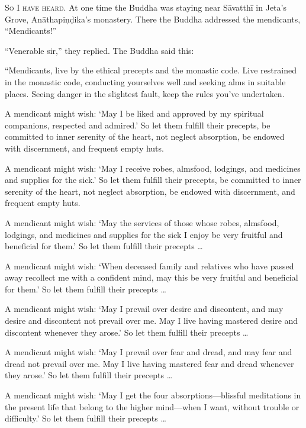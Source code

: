 \documentclass[12pt,openany]{book}%
\newcommand*{\scevam}[1]{\textsc{#1}}
\begin{document}
\scevam{So I have heard. }At one time the Buddha was staying near \textsanskrit{Sāvatthī} in Jeta’s Grove, \textsanskrit{Anāthapiṇḍika}’s monastery. There the Buddha addressed the mendicants, “Mendicants!” 

“Venerable sir,” they replied. The Buddha said this: 

“Mendicants, live by the ethical precepts and the monastic code. Live restrained in the monastic code, conducting yourselves well and seeking alms in suitable places. Seeing danger in the slightest fault, keep the rules you’ve undertaken. 

A mendicant might wish: ‘May I be liked and approved by my spiritual companions, respected and admired.’ So let them fulfill their precepts, be committed to inner serenity of the heart, not neglect absorption, be endowed with discernment, and frequent empty huts. 

A mendicant might wish: ‘May I receive robes, almsfood, lodgings, and medicines and supplies for the sick.’ So let them fulfill their precepts, be committed to inner serenity of the heart, not neglect absorption, be endowed with discernment, and frequent empty huts. 

A mendicant might wish: ‘May the services of those whose robes, almsfood, lodgings, and medicines and supplies for the sick I enjoy be very fruitful and beneficial for them.’ So let them fulfill their precepts … 

A mendicant might wish: ‘When deceased family and relatives who have passed away recollect me with a confident mind, may this be very fruitful and beneficial for them.’ So let them fulfill their precepts … 

A mendicant might wish: ‘May I prevail over desire and discontent, and may desire and discontent not prevail over me. May I live having mastered desire and discontent whenever they arose.’ So let them fulfill their precepts … 

A mendicant might wish: ‘May I prevail over fear and dread, and may fear and dread not prevail over me. May I live having mastered fear and dread whenever they arose.’ So let them fulfill their precepts … 

A mendicant might wish: ‘May I get the four absorptions—blissful meditations in the present life that belong to the higher mind—when I want, without trouble or difficulty.’ So let them fulfill their precepts … 
\end{document}
